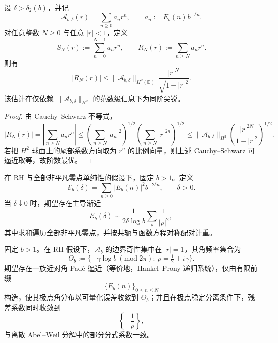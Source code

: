 \begin{proposition}\label{prop:abel-h2-tail-optimal-bound}
设 \(\delta>\delta_2(b)\)，并记
\[
\mathcal A_{b,\delta}(r)=\sum_{n\ge 0}a_n r^n,\qquad
a_n:=E_b(n)b^{-\delta n}.
\]
对任意整数 \(N\ge 0\) 与任意 \(|r|<1\)，定义
\[
S_N(r):=\sum_{n=0}^{N-1}a_n r^n,\qquad
R_N(r):=\sum_{n\ge N}a_n r^n.
\]
则有
\[
|R_N(r)|
\le
\|\mathcal A_{b,\delta}\|_{H^2(\mathbb D)}\,
\frac{|r|^N}{\sqrt{1-|r|^2}}.
\]
该估计在仅依赖 \(\|\mathcal A_{b,\delta}\|_{H^2}\) 的范数级信息下为同阶尖锐。
\end{proposition}
\begin{proof}
由 Cauchy--Schwarz 不等式，
\[
|R_N(r)|
=\left|\sum_{n\ge N}a_n r^n\right|
\le
\left(\sum_{n\ge N}|a_n|^2\right)^{1/2}
\left(\sum_{n\ge N}|r|^{2n}\right)^{1/2}
\le
\|\mathcal A_{b,\delta}\|_{H^2}
\left(\frac{|r|^{2N}}{1-|r|^2}\right)^{1/2}.
\]
若把 \(H^2\) 球面上的尾部系数方向取为 \(\bar r^n\) 的比例向量，则上述 Cauchy--Schwarz 可逼近取等，故阶数最优。
\end{proof}

\begin{conjecture}[小阻尼极限的谱主导项]\label{conj:abel-h2-small-damping-spectral-leading}
在 RH 与全部非平凡零点单纯性的假设下，固定 \(b>1\)。定义
\[
\mathcal E_b(\delta)=\sum_{n\ge 0}|E_b(n)|^2b^{-2\delta n},\qquad \delta>0.
\]
当 \(\delta\downarrow 0\) 时，期望存在主导渐近
\[
\mathcal E_b(\delta)\sim
\frac{1}{2\delta\log b}\sum_{\rho}\frac{1}{|\rho|^2},
\]
其中求和遍历全部非平凡零点，并按共轭与函数方程对称配对计重。
\end{conjecture}

\begin{conjecture}\label{conj:abel-pade-prony-finite-prefix-spectral-recovery}
固定 \(b>1\)。在 RH 假设下，\(\mathcal A_b\) 的边界奇性集中在 \(|r|=1\)，其角频率集合为
\[
\Theta_b:=\{-\gamma\log b\ (\mathrm{mod}\ 2\pi):\ \rho=\tfrac12+i\gamma\}.
\]
期望存在一族近对角 Pad\'e 逼近（等价地，Hankel--Prony 递归系统），仅由有限前缀
\[
\{E_b(n)\}_{0\le n\le N}
\]
构造，使其极点角分布以可量化误差收敛到 \(\Theta_b\)；并且在极点稳定分离条件下，残差系数同时收敛到
\[
\left\{-\frac{1}{\rho}\right\},
\]
与离散 Abel--Weil 分解中的部分分式系数一致。
\end{conjecture}
